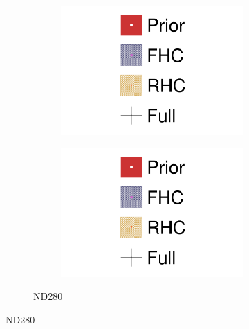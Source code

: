 \begin{figure}[h]
\begin{subfigure}[t]{\textwidth}
\begin{subfigure}[t]{0.24\textwidth}
		\end{subfigure}
		\begin{subfigure}[t]{0.24\textwidth}
			\includegraphics[width=\textwidth,page=8, trim={0mm 0mm 0mm 9mm}, clip]{figures/mach3/2018/data/2018a_FixedCov_RedCov_Mpi_NeuOnly_Data_merge_2018a_FixedCov_RedCov_Mpi_NeuBarOnly_Data_merge_2018a_FixedCov_RedCov_Mpi_Data_merge}
		\end{subfigure}
		\begin{subfigure}[t]{0.24\textwidth}
			\includegraphics[width=\textwidth,page=9, trim={0mm 0mm 0mm 9mm}, clip]{figures/mach3/2018/data/2018a_FixedCov_RedCov_Mpi_NeuOnly_Data_merge_2018a_FixedCov_RedCov_Mpi_NeuBarOnly_Data_merge_2018a_FixedCov_RedCov_Mpi_Data_merge}
		\end{subfigure}
		\caption{ND280}
	\end{subfigure}
	

\end{figure}
